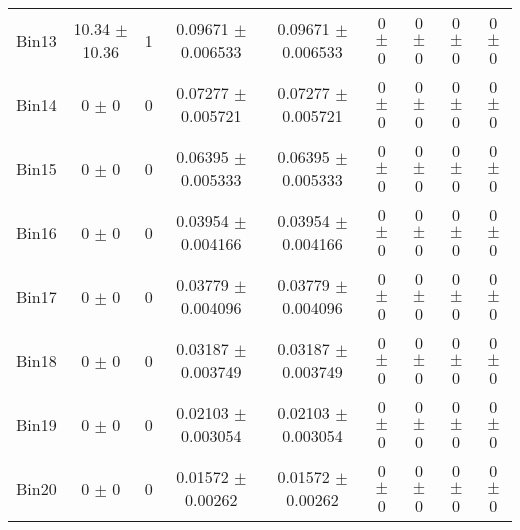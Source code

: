 \begin{tabular}{@{\extracolsep{4pt}}lcccccccc@{}}
     Bin13 & 10.34 $\pm$ 10.36 & 1 & 0.09671 $\pm$ 0.006533 & 0.09671 $\pm$ 0.006533 & 0 $\pm$ 0 & 0 $\pm$ 0 & 0 $\pm$ 0 & 0 $\pm$ 0 \\ 
     Bin14 & 0 $\pm$ 0 & 0 & 0.07277 $\pm$ 0.005721 & 0.07277 $\pm$ 0.005721 & 0 $\pm$ 0 & 0 $\pm$ 0 & 0 $\pm$ 0 & 0 $\pm$ 0 \\ 
     Bin15 & 0 $\pm$ 0 & 0 & 0.06395 $\pm$ 0.005333 & 0.06395 $\pm$ 0.005333 & 0 $\pm$ 0 & 0 $\pm$ 0 & 0 $\pm$ 0 & 0 $\pm$ 0 \\ 
     Bin16 & 0 $\pm$ 0 & 0 & 0.03954 $\pm$ 0.004166 & 0.03954 $\pm$ 0.004166 & 0 $\pm$ 0 & 0 $\pm$ 0 & 0 $\pm$ 0 & 0 $\pm$ 0 \\ 
     Bin17 & 0 $\pm$ 0 & 0 & 0.03779 $\pm$ 0.004096 & 0.03779 $\pm$ 0.004096 & 0 $\pm$ 0 & 0 $\pm$ 0 & 0 $\pm$ 0 & 0 $\pm$ 0 \\ 
     Bin18 & 0 $\pm$ 0 & 0 & 0.03187 $\pm$ 0.003749 & 0.03187 $\pm$ 0.003749 & 0 $\pm$ 0 & 0 $\pm$ 0 & 0 $\pm$ 0 & 0 $\pm$ 0 \\ 
     Bin19 & 0 $\pm$ 0 & 0 & 0.02103 $\pm$ 0.003054 & 0.02103 $\pm$ 0.003054 & 0 $\pm$ 0 & 0 $\pm$ 0 & 0 $\pm$ 0 & 0 $\pm$ 0 \\ 
     Bin20 & 0 $\pm$ 0 & 0 & 0.01572 $\pm$ 0.00262 & 0.01572 $\pm$ 0.00262 & 0 $\pm$ 0 & 0 $\pm$ 0 & 0 $\pm$ 0 & 0 $\pm$ 0 \\ 
\hline\hline
  \end{tabular}
